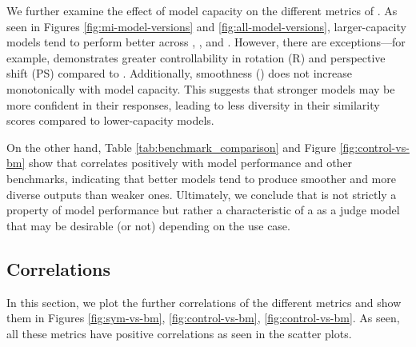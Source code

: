 We further examine the effect of model capacity on the different metrics of \mmscore. As seen in Figures \ref{fig:mi-model-versions} and \ref{fig:all-model-versions}, larger-capacity models tend to perform better across \nmi, \relaxsym, and \control. However, there are exceptions—for example, \internvlTwoFourB{} demonstrates greater controllability in rotation (R) and perspective shift (PS) compared to \internvlTwoEightB. Additionally, smoothness (\smoothness{}) does not increase monotonically with model capacity. This suggests that stronger models may be more confident in their responses, leading to less diversity in their similarity scores compared to lower-capacity models.

On the other hand, Table \ref{tab:benchmark_comparison} and Figure \ref{fig:control-vs-bm} show that \smoothness{} correlates positively with model performance and other benchmarks, indicating that better models tend to produce smoother and more diverse outputs than weaker ones. Ultimately, we conclude that \smoothness{} is not strictly a property of model performance but rather a characteristic of a \model{} as a judge model that may be desirable (or not) depending on the use case. 






\subsection{Correlations}
\label{sec:bm-correlations}

In this section, we plot the further correlations of the different metrics and show them in Figures \ref{fig:sym-vs-bm}, \ref{fig:control-vs-bm}, \ref{fig:control-vs-bm}. As seen, all these metrics have positive correlations as seen in the scatter plots.






% 
